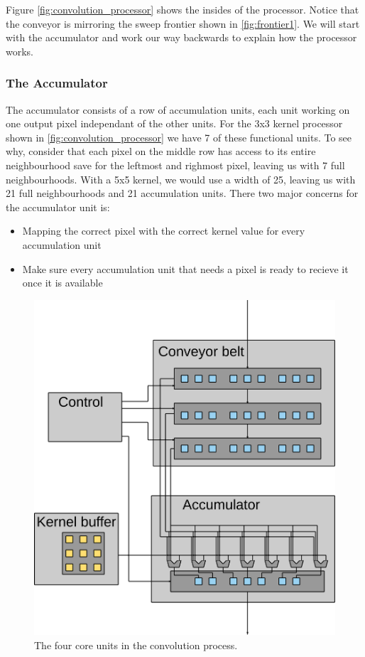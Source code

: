 Figure \ref{fig:convolution_processor} shows the insides of the processor. Notice that the conveyor is mirroring the sweep frontier shown in \ref{fig:frontier1}.
We will start with the accumulator and work our way backwards to explain how the processor works.

\subsubsection{The Accumulator}
The accumulator consists of a row of accumulation units, each unit working on one output pixel independant of the other units.
For the 3x3 kernel processor shown in \ref{fig:convolution_processor} we have 7 of these functional units.
To see why, consider that each pixel on the middle row has access to its entire neighbourhood save for the leftmost and righmost pixel, leaving us with 7 full neighbourhoods.
With a 5x5 kernel, we would use a width of 25, leaving us with 21 full neighbourhoods and 21 accumulation units.
There two major concerns for the accumulator unit is:
\begin{itemize}
    \item Mapping the correct pixel with the correct kernel value for every accumulation unit
    \item Make sure every accumulation unit that needs a pixel is ready to recieve it once it is available
\end{itemize}


\begin{figure}[h!]
    \includegraphics[width=\linewidth]{img/processor_overview.png}
    \caption{The four core units in the convolution process.}
    \label{fig:processor_core}
\end{figure}

